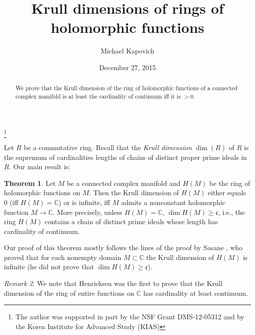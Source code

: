 \documentclass{amsproc}
\theoremstyle{definition}
\newtheorem{theorem}{Theorem}
\theoremstyle{definition}
\theoremstyle{remark}
\newtheorem{remark}[theorem]{Remark}
\begin{document}
\title{Krull dimensions of rings of holomorphic functions}
\author{Michael Kapovich}
\address{Department of Mathematics, 
University of California, Davis, 
CA 95616}
\thanks{The author was supported in part by the NSF Grant DMS-12-05312 and by the Korea Institute for Advanced Study (KIAS)}



\date{December 27, 2015}

\begin{abstract}
We prove that the Krull dimension of the ring of holomorphic functions of a connected complex manifold is at least the cardinality of continuum iff it is $>0$. 
\end{abstract}

\maketitle

Let $R$ be a commutative ring. Recall that the {\em Krull dimension} $\dim(R)$ of $R$ is the supremum of cardinalities lengths of chains of  distinct proper prime ideals in $R$. Our main result is: 

\begin{theorem}\label{main}
Let $M$ be a connected complex manifold and $H(M)$ be the ring of holomorphic functions on $M$. Then the Krull dimension of $H(M)$ either equals $0$ (iff $H(M)= {{\mathbb C}}$) or is infinite, iff $M$ admits a nonconstant holomorphic function $M\to {{\mathbb C}}$. More precisely, unless $H(M)={{\mathbb C}}$, $\dim H(M)\ge {\mathfrak c}$, i.e., the ring $H(M)$ 
contains a chain of distinct prime ideals whose length has cardinality of continuum. 
\end{theorem}

Our proof of this theorem mostly follows the lines of the proof by Sasane \cite{Sasane}, who proved that for each nonempty domain $M\subset {{\mathbb C}}$ the Krull dimension of $H(M)$ is infinite (he did not prove that $\dim H(M)\ge {\mathfrak c}$). 

\begin{remark}
We note that Henricksen \cite{Henricksen} was the first to prove that the Krull dimension of the ring of entire functions on ${{\mathbb C}}$ has cardinality at least continuum.
\end{remark}
\end{document}
